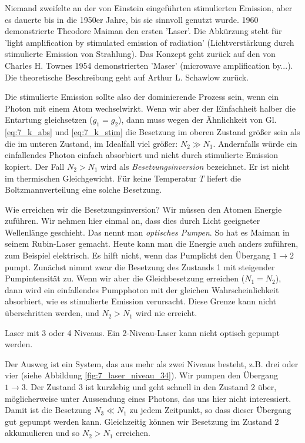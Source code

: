 Niemand zweifelte an der von Einstein eingeführten stimulierten Emission, aber es dauerte bis in die 1950er Jahre, bis sie sinnvoll genutzt wurde. 1960 demonstrierte Theodore Maiman den ersten 'Laser'. Die Abkürzung steht für 'light amplification by stimulated emission of radiation' (Lichtverstärkung durch stimulierte Emission von Strahlung). Das Konzept geht zurück auf den von Charles H. Townes 1954 demonstrierten 'Maser' (microwave amplification by...). Die theoretische Beschreibung geht auf Arthur L. Schawlow zurück.

Die stimulierte Emission sollte also der dominierende Prozess sein, wenn ein Photon mit einem Atom wechselwirkt. Wenn wir aber der Einfachheit halber die Entartung gleichsetzen ($g_1 = g_2$), dann muss wegen der Ähnlichkeit von Gl. \ref{eq:7_k_abs} und \ref{eq:7_k_stim} die Besetzung im oberen Zustand größer sein als die im unteren Zustand, im Idealfall viel größer: $N_2 \gg N_1$. Andernfalls würde ein einfallendes Photon einfach absorbiert und nicht durch stimulierte Emission kopiert. Der Fall $N_2 > N_1$ wird als \emph{Besetzungsinversion} bezeichnet. Er ist nicht im thermischen Gleichgewicht. Für keine Temperatur $T$ liefert die Boltzmannverteilung eine solche Besetzung.

Wie erreichen wir die Besetzungsinversion? Wir müssen den Atomen Energie zuführen. Wir nehmen hier einmal an, dass dies durch Licht geeigneter Wellenlänge geschieht. Das nennt man \emph{optisches Pumpen}. So hat es Maiman in seinem Rubin-Laser gemacht. Heute kann man die Energie auch anders zuführen, zum Beispiel elektrisch. Es hilft nicht, wenn das Pumplicht den Übergang $1 \rightarrow 2$ pumpt. Zunächst nimmt zwar die Besetzung des Zustands 1 mit steigender Pumpintensität zu. Wenn wir aber die Gleichbesetzung erreichen ($N_1 = N_2$), dann wird ein einfallendes Pumpphoton mit der gleichen Wahrscheinlichkeit absorbiert, wie es stimulierte Emission verursacht. Diese Grenze kann nicht überschritten werden, und $N_2 > N_1$ wird nie erreicht.


\begin{marginfigure}
    \caption{Laser mit 3 oder 4 Niveaus. Ein 2-Niveau-Laser kann nicht optisch gepumpt werden.}
    \label{fig:7_laser_niveau_34}
\end{marginfigure}

Der Ausweg ist ein System, das aus mehr als zwei Niveaus besteht, z.B. drei oder vier (siehe Abbildung  \ref{fig:7_laser_niveau_34}). Wir pumpen den Übergang $1 \rightarrow 3$. Der Zustand 3 ist kurzlebig und geht schnell in den Zustand 2 über, möglicherweise unter Aussendung eines Photons, das uns hier nicht interessiert. Damit ist die Besetzung $N_3 \ll N_1$ zu jedem Zeitpunkt, so dass dieser Übergang gut gepumpt werden kann. Gleichzeitig können wir  Besetzung im Zustand 2 akkumulieren und so $N_2 > N_1$ erreichen.

